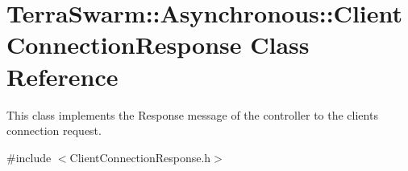 \hypertarget{class_terra_swarm_1_1_asynchronous_1_1_client_connection_response}{\section{Terra\-Swarm\-:\-:Asynchronous\-:\-:Client\-Connection\-Response Class Reference}
\label{class_terra_swarm_1_1_asynchronous_1_1_client_connection_response}
}


This class implements the Response message of the controller to the clients connection request.  




{\ttfamily \#include $<$Client\-Connection\-Response.\-h$>$}

